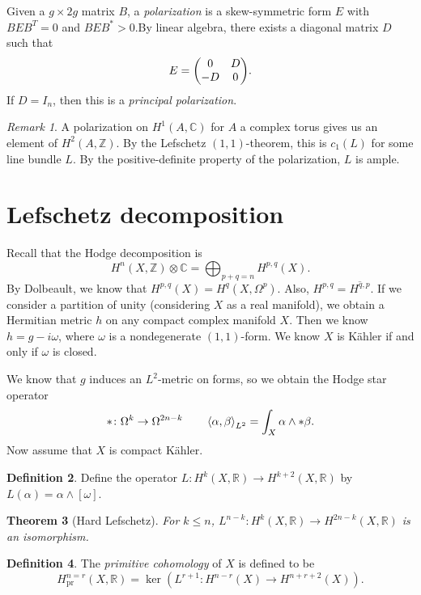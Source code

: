 \documentclass[leqno, openany]{memoir}
\newtheorem{thm}{Theorem}[section]
\theoremstyle{definition}
\newtheorem{defn}[thm]{Definition}
\theoremstyle{remark}
\newtheorem{rmk}[thm]{Remark}
\theoremstyle{plain}
\theoremstyle{definition}
\theoremstyle{remark}
\newcommand{\R}{\mathbb{R}}
\newcommand{\C}{\mathbb{C}}
\newcommand{\Z}{\mathbb{Z}}
\newcommand{\mr}[1]{\mathrm{#1}}
\newcommand{\ol}[1]{\overline{#1}}
\begin{document}
Given a $g \times 2g$ matrix $B$, a \textit{polarization} is a skew-symmetric form $E$ with $BEB^T = 0$ and $BEB^* > 0$.By linear algebra, there exists a diagonal matrix $D$ such that
\[ E = \mqty(0 & D \\ -D & 0). \]
If $D = I_n$, then this is a \textit{principal polarization}.

\begin{rmk}
    A polarization on $H^1(A, \C)$ for $A$ a complex torus gives us an element of $H^2(A, \Z)$. By the Lefschetz $(1,1)$-theorem, this is $c_1(L)$ for some line bundle $L$. By the positive-definite property of the polarization, $L$ is ample.
\end{rmk}

\section{Lefschetz decomposition}%
\label{sec:lefschetz_decomposition}

Recall that the Hodge decomposition is
\[ H^n(X, \Z) \otimes \C = \bigoplus_{p+q = n} H^{p,q}(X). \]
By Dolbeault, we know that $H^{p,q} (X) = H^q(X, \Omega^p)$. Also, $H^{p,q} = \ol{H^{q,p}}$. If we consider a partition of unity (considering $X$ as a real manifold), we obtain a Hermitian metric $h$ on any compact complex manifold $X$. Then we know $h = g-i\omega$, where $\omega$ is a nondegenerate $(1,1)$-form. We know $X$ is K\"ahler if and only if $\omega$ is closed.

We know that $g$ induces an $L^2$-metric on forms, so we obtain the Hodge star operator
\[ * \colon \Omega^k \to \Omega^{2n-k} \qquad \ev{\alpha, \beta}_{L^2} = \int_X \alpha \wedge *\beta. \]
Now assume that $X$ is compact K\"ahler.

\begin{defn}
    Define the operator $L \colon H^k(X, \R) \to H^{k+2}(X, \R)$ by $L(\alpha) = \alpha \wedge [\omega]$.
\end{defn}

\begin{thm}[Hard Lefschetz]
    For $k \leq n$, $L^{n-k} \colon H^k(X, \R) \to H^{2n-k}(X, \R)$ is an isomorphism.
\end{thm}

\begin{defn}
    The \textit{primitive cohomology} of $X$ is defined to be
    \[ H^{n=r}_{\mr{pr}}(X, \R) = \ker(L^{r+1} \colon H^{n-r}(X) \to H^{n+r+2}(X)). \]
\end{defn}
\end{document}
